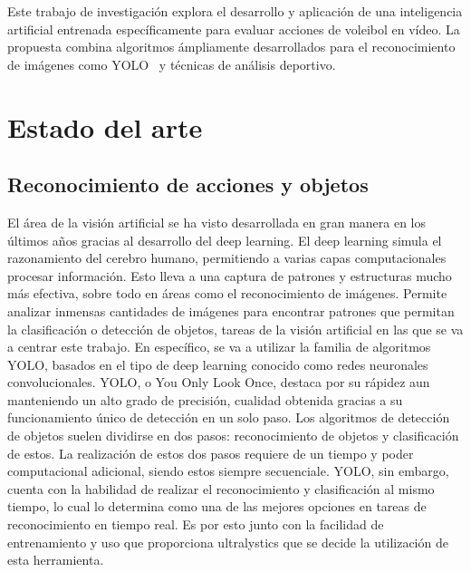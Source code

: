 \documentclass[12pt]{report} %
\begin{document}
    Este trabajo de investigación explora el desarrollo y aplicación de una
    inteligencia artificial entrenada específicamente para evaluar acciones de
    voleibol en vídeo. La propuesta combina algoritmos ámpliamente
    desarrollados para el reconocimiento de imágenes como YOLO~\cite{YOLO} y
    técnicas de análisis deportivo.

 

    \chapter{Estado del arte}
    \label{chap:estadoarte}
    \section{Reconocimiento de acciones y objetos}
    El área de la visión artificial se ha visto desarrollada en gran manera en los últimos años gracias al desarrollo del deep learning. El deep learning simula el razonamiento del cerebro humano, permitiendo a varias capas computacionales procesar información. Esto lleva a una captura de patrones y estructuras mucho más efectiva, sobre todo en áreas como el reconocimiento de imágenes. Permite analizar inmensas cantidades de imágenes para encontrar patrones que permitan la clasificación o detección de objetos, tareas de la visión artificial en las que se va a centrar este trabajo.
    En específico, se va a utilizar la familia de algoritmos YOLO, basados en el tipo de deep learning conocido como redes neuronales convolucionales. YOLO, o You Only Look Once, destaca por su rápidez aun manteniendo un alto grado de precisión, cualidad obtenida gracias a su funcionamiento único de detección en un solo paso. Los algoritmos de detección de objetos suelen dividirse en dos pasos: reconocimiento de objetos y clasificación de estos. La realización de estos dos pasos requiere de un tiempo y poder computacional adicional, siendo estos siempre secuenciale. YOLO, sin embargo, cuenta con la habilidad de realizar el reconocimiento y clasificación al mismo tiempo, lo cual lo determina como una de las mejores opciones en tareas de reconocimiento en tiempo real. Es por esto junto con la facilidad de entrenamiento y uso que proporciona ultralystics que se decide la utilización de esta herramienta.
\end{document}
